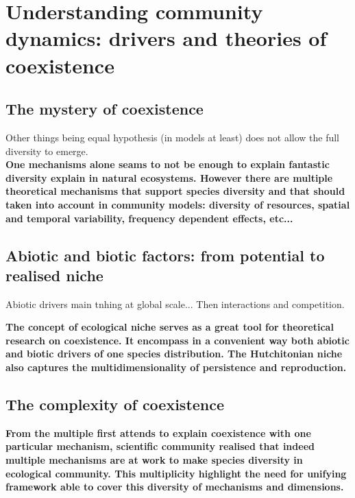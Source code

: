 \chapter{Understanding community dynamics: drivers and theories of coexistence}

\section{The mystery of coexistence}

Other things being equal hypothesis (in models at least) does not allow the full diversity to emerge.\\

\textbf{One mechanisms alone seams to not be enough to explain fantastic diversity explain in natural ecosystems. However there are multiple theoretical mechanisms that support species diversity and that should taken into account in community models: diversity of resources, spatial and temporal variability, frequency dependent effects, etc...}

\section{Abiotic and biotic factors: from potential to realised niche}

Abiotic drivers main tnhing at global scale... Then interactions and competition.

\textbf{The concept of ecological niche serves as a great tool for theoretical research on coexistence. It encompass in a convenient way both abiotic and biotic drivers of one species distribution. The Hutchitonian niche also captures the multidimensionality of persistence and reproduction.}
\section{The complexity of coexistence}

\textbf{From the multiple first attends to explain coexistence with one particular mechanism, scientific community realised that indeed multiple mechanisms are at work to make species diversity in ecological community. This multiplicity highlight the need for unifying framework able to cover this diversity of mechanisms and dimensions.}

